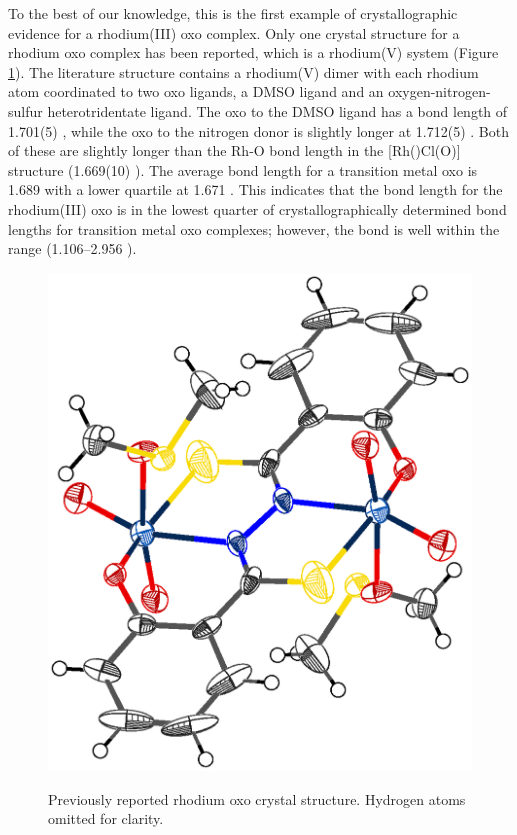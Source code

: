 To the best of our knowledge, this is the first example of crystallographic evidence for a rhodium(III) oxo complex.  Only one crystal structure for a rhodium oxo complex has been reported, which is a rhodium(V) system (Figure \ref{Kaczul}).\cite{Gangopadhyay2010}  The literature structure contains a rhodium(V) dimer with each rhodium atom coordinated to two oxo ligands, a DMSO ligand and an oxygen-nitrogen-sulfur heterotridentate ligand.  The oxo \trans{} to the DMSO ligand has a bond length of 1.701(5) \A, while the oxo \trans{} to the nitrogen donor is slightly longer at 1.712(5) \A.  Both of these are slightly longer than the Rh-O bond length in the [Rh(\tBuxantphos)Cl(O)] structure (1.669(10) \A).  The average bond length for a transition metal oxo is 1.689 \A{} with a lower quartile at 1.671 \A.\cite{Allen2002}  This indicates that the bond length for the rhodium(III) oxo is in the lowest quarter of crystallographically determined bond lengths for transition metal oxo complexes; however, the bond is well within the range (1.106--2.956 \A).  

\begin{figure}[htb]
\begin{center}
\includegraphics[scale=0.7]{../Othercrystals/KACZUL.eps}
\caption[Previously reported rhodium oxo crystal structure]{Previously reported rhodium oxo crystal structure.\cite{Gangopadhyay2010} Hydrogen atoms omitted for clarity.}
\vspace{0.2cm}
\label{Kaczul}
\end{center}
\end{figure}
\vspace{0.2cm}

